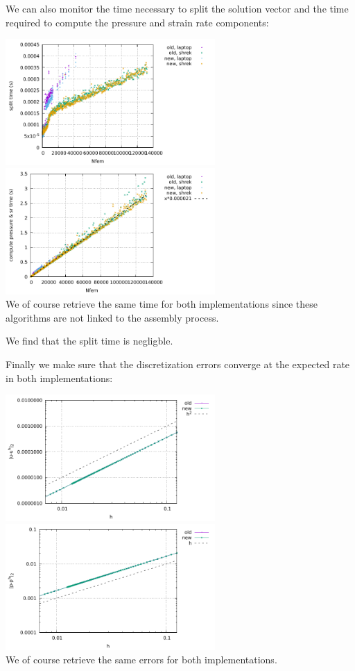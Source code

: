 We can also monitor the time necessary to split the solution vector
and the time required to compute the pressure and strain rate components:
\begin{center}
\includegraphics[width=8cm]{python_codes/fieldstone_176/RESULTS/split.pdf}
\includegraphics[width=8cm]{python_codes/fieldstone_176/RESULTS/compute_press_sr.pdf}\\
{\captionfont We of course retrieve the same time for both implementations since
these algorithms are not linked to the assembly process.}
\end{center}
We find that the split time is negligble. 


Finally we make sure that the discretization errors converge at the expected rate
in both implementations:
\begin{center}
\includegraphics[width=8cm]{python_codes/fieldstone_176/RESULTS/errv.pdf}
\includegraphics[width=8cm]{python_codes/fieldstone_176/RESULTS/errp.pdf}\\
{\captionfont We of course retrieve the same errors for both implementations.}
\end{center}
